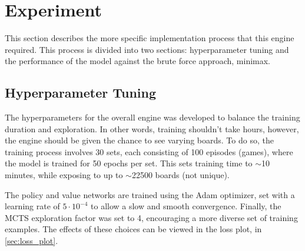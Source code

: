 \section{Experiment}
This section describes the more specific implementation process that this engine required. This process is divided into two sections: hyperparameter tuning and the performance of the model against the brute force approach, minimax.


\subsection{Hyperparameter Tuning}
The hyperparameters for the overall engine was developed to balance the training duration and exploration. In other words, training shouldn't take hours, however, the engine should be given the chance to see varying boards. To do so, the training process involves 30 sets, each consisting of 100 episodes (games), where the model is trained for 50 epochs per set. This sets training time to $\sim$10 minutes, while exposing to up to $\sim$22500 boards (not unique).

The policy and value networks are trained using the Adam optimizer, set with a learning rate of $5\cdot 10^{-4}$ to allow a slow and smooth convergence. Finally, the MCTS exploration factor was set to 4, encouraging a more diverse set of training examples. The effects of these choices can be viewed in the loss plot, in \cref{sec:loss_plot}. 

